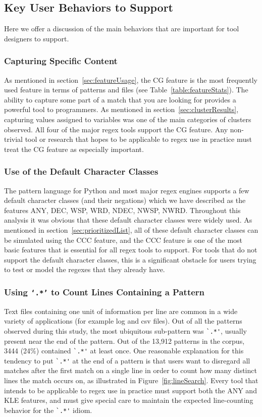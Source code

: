 \subsection{Key User Behaviors to Support}
Here we offer a discussion of the main behaviors that are important for tool designers to support.
\subsubsection{Capturing Specific Content}
As mentioned in section~\ref{sec:featureUsage}, the CG feature is the most frequently used feature in terms of patterns and files (see Table~\ref{table:featureStats}).  The ability to capture some part of a match that you are looking for provides a powerful tool to programmers.  As mentioned in section~\ref{sec:clusterResults}, capturing values assigned to variables was one of the main categories of clusters observed.  All four of the major regex tools support the CG feature.  Any non-trivial tool or research that hopes to be applicable to regex use in practice must treat the CG feature as especially important.

\subsubsection{Use of the Default Character Classes}
The pattern language for Python and most major regex engines supports a few default character classes (and their negations) which we have described as the features ANY, DEC, WSP, WRD, NDEC, NWSP, NWRD.  Throughout this analysis it was obvious that these default character classes were widely used.  As mentioned in section~\ref{sec:prioritizedList}, all of these default character classes can be simulated using the CCC feature, and the CCC feature is one of the most basic features that is essential for all regex tools to support.  For tools that do not support the default character classes, this is a significant obstacle for users trying to test or model the regexes that they already have.

\subsubsection{Using {\tt`.*'} to Count Lines Containing a Pattern}
Text files containing one unit of information per line are common in a wide variety of applications (for example log and csv files).  Out of all the patterns observed during this study, the most ubiquitous sub-pattern was \verb!`.*'!, usually present near the end of the pattern.  Out of the 13,912 patterns in the corpus, 3444 (24\%) contained \verb!`.*'! at least once.
One reasonable explanation for this tendency to put \verb!`.*'! at the end of a pattern is that users want to disregard all matches after the first match on a single line in order to count how many distinct lines the match occurs on, as illustrated in Figure~\ref{fig:lineSearch}.  Every tool that intends to be applicable to regex use in practice must support both the ANY and KLE features, and must give special care to maintain the expected line-counting behavior for the \verb!`.*'! idiom.

